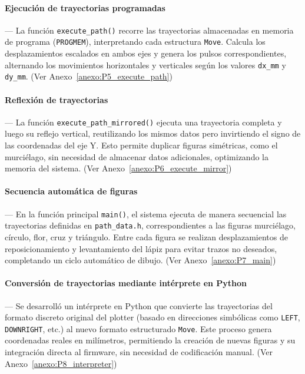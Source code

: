 \vspace{1em}

\paragraph*{\textbf{Ejecución de trayectorias programadas}}---
La función \texttt{execute\_path()} recorre las trayectorias almacenadas en memoria de programa (\texttt{PROGMEM}), interpretando cada estructura \texttt{Move}. Calcula los desplazamientos escalados en ambos ejes y genera los pulsos correspondientes, alternando los movimientos horizontales y verticales según los valores \texttt{dx\_mm} y \texttt{dy\_mm}. (Ver Anexo~\ref{anexo:P5_execute_path})

\vspace{1em}

\paragraph*{\textbf{Reflexión de trayectorias}}---
La función \texttt{execute\_path\_mirrored()} ejecuta una trayectoria completa y luego su reflejo vertical, reutilizando los mismos datos pero invirtiendo el signo de las coordenadas del eje Y. Esto permite duplicar figuras simétricas, como el murciélago, sin necesidad de almacenar datos adicionales, optimizando la memoria del sistema. (Ver Anexo~\ref{anexo:P6_execute_mirror})

\vspace{1em}

\paragraph*{\textbf{Secuencia automática de figuras}}---
En la función principal \texttt{main()}, el sistema ejecuta de manera secuencial las trayectorias definidas en \texttt{path\_data.h}, correspondientes a las figuras murciélago, círculo, flor, cruz y triángulo. Entre cada figura se realizan desplazamientos de reposicionamiento y levantamiento del lápiz para evitar trazos no deseados, completando un ciclo automático de dibujo. (Ver Anexo~\ref{anexo:P7_main})

\vspace{1em}

\paragraph*{\textbf{Conversión de trayectorias mediante intérprete en Python}}---
Se desarrolló un intérprete en Python que convierte las trayectorias del formato discreto original del plotter (basado en direcciones simbólicas como \texttt{LEFT}, \texttt{DOWNRIGHT}, etc.) al nuevo formato estructurado \texttt{Move}. Este proceso genera coordenadas reales en milímetros, permitiendo la creación de nuevas figuras y su integración directa al firmware, sin necesidad de codificación manual. (Ver Anexo~\ref{anexo:P8_interpreter})



